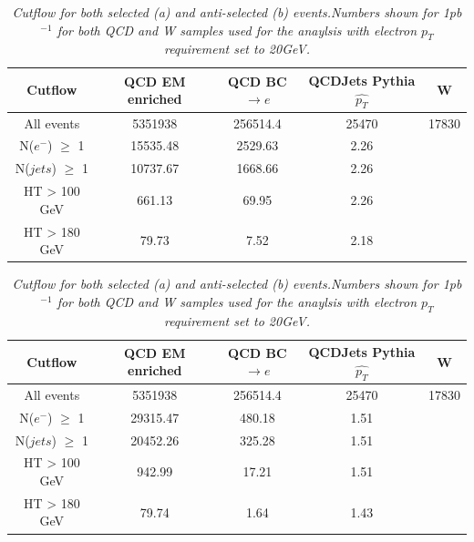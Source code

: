 \documentclass[12pt]{article}
\begin{document}
\begin{table}[h!]
\begin{center}
\begin{tabular}{|c|c|c|c|c|}
\hline
Cutflow & QCD EM enriched & QCD BC$\rightarrow e$ & QCDJets Pythia $\hat{p_{T}}$ &  W \\
\hline
All events & 5351938 & 256514.4 & 25470 & 17830 \\
\hline
N($e^{-}$) $\geq$ 1 & 15535.48 & 2529.63 & 2.26 & \\
\hline
N($jets$) $\geq$ 1 & 10737.67 & 1668.66 & 2.26 & \\
\hline
HT > 100 GeV & 661.13 & 69.95 & 2.26 &\\
\hline
HT > 180 GeV & 79.73 & 7.52 & 2.18 & \\
\hline
\end{tabular}


\begin{tabular}{|c|c|c|c|c|}
\hline
Cutflow & QCD EM enriched & QCD BC$\rightarrow e$ & QCDJets Pythia $\hat{p_{T}}$ &  W \\
\hline
All events & 5351938 & 256514.4 & 25470 & 17830\\
\hline
N($e^{-}$) $\geq$ 1 & 29315.47 & 480.18 & 1.51 & \\
\hline
N($jets$) $\geq$ 1 & 20452.26 & 325.28 & 1.51 & \\
\hline
HT > 100 GeV & 942.99 & 17.21 & 1.51 & \\
\hline
HT > 180 GeV & 79.74 & 1.64 & 1.43 & \\
\hline
\end{tabular}
\end{center}
\caption{\textit{Cutflow for both selected (a) and anti-selected (b) events.Numbers shown for 1pb$^{-1}$ for both QCD and W samples used for the anaylsis with electron $p_{T}$ requirement set to 20GeV.}}
\label{tab:numbers 20}
\end{table}
\end{document}
